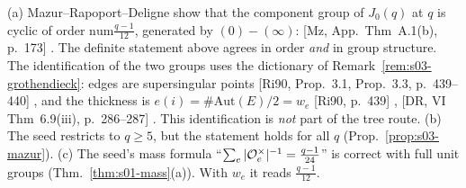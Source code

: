 \begin{remark}\label{rem:s03-mazur}
(a) Mazur--Rapoport--Deligne show that the component group of $J_0(q)$ at $q$ is cyclic of order $\mathrm{num}\frac{q-1}{12}$,
generated by $(0)-(\infty)$: [Mz, App.\ Thm~A.1(b), p.~173]
 \stcited. The definite
statement above agrees in order \emph{and} in group structure. The identification of the two groups uses the dictionary of
Remark~\ref{rem:s03-grothendieck}: edges are supersingular points [Ri90, Prop.~3.1, Prop.~3.3, p.~439--440]
, and the
thickness is $e(i)=\#\mathrm{Aut}(E)/2=w_e$ [Ri90, p.~439]
,
[DR, VI Thm~6.9(iii), p.~286--287]
 \stcited. This identification is
\emph{not} part of the tree route.
(b) The seed restricts to $q\ge5$, but the statement holds for all $q$ (Prop.~\ref{prop:s03-mazur}).
(c) The seed's mass formula ``$\sum_e|\mathcal{O}_e^\times|^{-1}=\frac{q-1}{24}$'' is correct with full unit groups (Thm.~\ref{thm:s01-mass}(a)). With
$w_e$ it reads $\frac{q-1}{12}$.
\end{remark}

